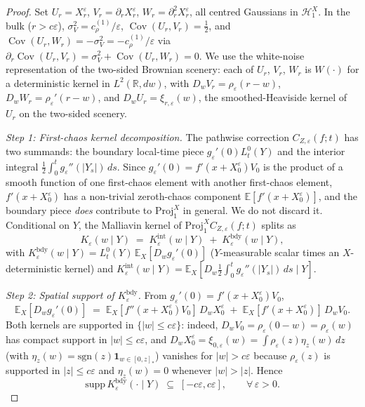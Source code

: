 \documentclass[11pt,reqno]{amsart}
\theoremstyle{plain}
\theoremstyle{definition}
\theoremstyle{remark}
\newcommand{\R}{\mathbb{R}}
\newcommand{\E}{\mathbb{E}}
\newcommand{\Hilb}{\mathcal{H}}
\newcommand{\IBM}{Z}
\DeclareMathOperator{\Cov}{Cov}
\begin{document}
\begin{proof}
Set $U_r=X^\varepsilon_r$, $V_r=\partial_rX^\varepsilon_r$,
$W_r=\partial_r^{2}X^\varepsilon_r$, all centred Gaussians in
$\Hilb_1^{X}$. In the bulk ($r>c\varepsilon$),
$\sigma_V^{2}=c_\rho^{(1)}/\varepsilon$, $\Cov(U_r,V_r)=\tfrac12$,
and
$\Cov(U_r,W_r)=-\sigma_V^{2}=-c_\rho^{(1)}/\varepsilon$ via
$\partial_r\Cov(U_r,V_r)=\sigma_V^{2}+\Cov(U_r,W_r)=0$. We use the
white-noise representation of the two-sided Brownian scenery: each
of $U_r$, $V_r$, $W_r$ is $W(\cdot)$ for a deterministic kernel in
$L^{2}(\R,dw)$, with $D_wV_r=\rho_\varepsilon(r-w)$,
$D_wW_r=\rho_\varepsilon'(r-w)$, and $D_wU_r=\xi_{r,\varepsilon}(w)$,
the smoothed-Heaviside kernel of $U_r$ on the two-sided scenery.

\emph{Step 1: First-chaos kernel decomposition.}
The pathwise correction $C_{\IBM,\varepsilon}(f;t)$ has two
summands: the boundary local-time piece $g_\varepsilon'(0)L_t^{0}(Y)$
and the interior integral
$\tfrac12\!\int_0^{t}g_\varepsilon''(|Y_s|)\,ds$. Since
$g_\varepsilon'(0)=f'(x+X_0^\varepsilon)V_0$ is the product of a
smooth function of one first-chaos element with another first-chaos
element, $f'(x+X_0^\varepsilon)$ has a non-trivial zeroth-chaos
component $\E[f'(x+X_0^\varepsilon)]$, and the boundary piece
\emph{does} contribute to $\mathrm{Proj}_1^{X}$ in general. We do
not discard it. Conditional on $Y$, the Malliavin kernel of
$\mathrm{Proj}_1^{X}C_{\IBM,\varepsilon}(f;t)$ splits as
\begin{equation}\label{eq:Kdecomp}
  K_\varepsilon(w\mid Y)
   \;=\;K_\varepsilon^{\mathrm{int}}(w\mid Y)
   \;+\;K_\varepsilon^{\mathrm{bdy}}(w\mid Y),
\end{equation}
with $K_\varepsilon^{\mathrm{bdy}}(w\mid Y)=L_t^{0}(Y)\,\E_X[D_wg_\varepsilon'(0)]$
($Y$-measurable scalar times an $X$-deterministic kernel) and
$K_\varepsilon^{\mathrm{int}}(w\mid Y)=\E_X[D_w\tfrac12\!\int_0^{t}g_\varepsilon''(|Y_s|)\,ds\mid Y]$.

\emph{Step 2: Spatial support of $K_\varepsilon^{\mathrm{bdy}}$.}
From $g_\varepsilon'(0)=f'(x+X_0^\varepsilon)V_0$,
\[
  \E_X[D_wg_\varepsilon'(0)]
   \;=\;\E_X[f''(x+X_0^\varepsilon)V_0]\,D_wX_0^\varepsilon
   \;+\;\E_X[f'(x+X_0^\varepsilon)]\,D_wV_0.
\]
Both kernels are supported in $\{|w|\le c\varepsilon\}$: indeed,
$D_wV_0=\rho_\varepsilon(0-w)=\rho_\varepsilon(w)$ has compact
support in $|w|\le c\varepsilon$, and
$D_wX_0^\varepsilon=\xi_{0,\varepsilon}(w)=\int\rho_\varepsilon(z)\eta_z(w)\,dz$
(with $\eta_z(w)=\mathrm{sgn}(z)\mathbf 1_{w\in[0,z]_{*}}$) vanishes
for $|w|>c\varepsilon$ because $\rho_\varepsilon(z)$ is supported in
$|z|\le c\varepsilon$ and $\eta_z(w)=0$ whenever $|w|>|z|$. Hence
\begin{equation}\label{eq:Kbdy-support}
  \mathrm{supp}\,K_\varepsilon^{\mathrm{bdy}}(\cdot\mid Y)
   \;\subseteq\;[-c\varepsilon,c\varepsilon],\qquad\forall\,\varepsilon>0.
\end{equation}


\end{proof}
\end{document}
